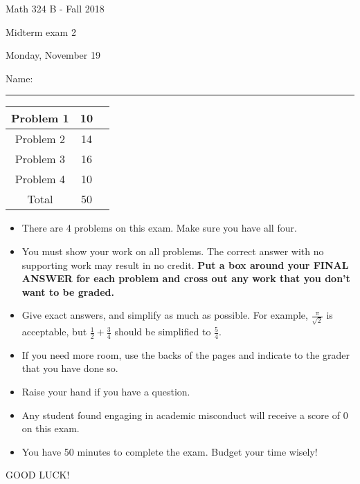 \documentclass[12 pt]{report}
\begin{document}
\noindent \vfill \noindent \large

\centerline{Math 324 B  - Fall 2018}

\centerline{Midterm exam 2}

\centerline{Monday, November 19}

\normalsize

\vfill
\medskip
Name: \rule{10cm}{1pt}

\bigskip

\vfill
\begin{center}
{\large
\begin{tabular}{||c|c|r||}
\hline Problem 1 & 10 & \hspace{10mm} \hfill \\
\hline Problem 2 & 14 & \hspace{10mm} \hfill \\
\hline Problem 3 & 16 & \hspace{10mm} \hfill \\
\hline Problem 4 & 10  & \hspace{10mm} \hfill \\
\hline Total & 50 & \hspace{10mm} \hfill \\
\hline
\end{tabular}
}
\end{center}
\vfill
\begin{itemize}
\item There are 4 problems on this exam. Make sure you have all four.
\item You must show your work on all problems.  The correct answer
with no supporting work may result in no credit. \textbf{Put a box
around your FINAL ANSWER for each problem and cross out any work
that you don't want to be graded.} 
\item Give exact answers, and simplify as much as possible. 
For example, $\frac{\pi}{\sqrt{2}}$ is acceptable, but $\frac{1}{2} + \frac{3}{4}$
should be simplified to $\frac{5}{4}$.   

\item If you need more room, use the backs
of the pages and indicate to the grader that you have done so.
\item Raise your hand if you have a question.
\item Any student found engaging in academic misconduct will receive
a score of 0 on this exam.
\item You have 50 minutes to complete the exam.  Budget your time wisely! \\
\end{itemize}
\vfill
\begin{center}GOOD LUCK!\end{center}
\end{document}
